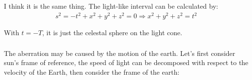 \documentclass[]{ctexart}
\begin{document}
		\subsubsection{}
			I think it is the same thing. The light-like interval can be calculated by:
				\begin{equation*}
				\begin{aligned}
					s^2=-t^2+x^2+y^2+z^2=0\Rightarrow x^2+y^2+z^2=t^2
				\end{aligned}
				\end{equation*}
			
			With $t=-T$, it is just the celestal sphere on the light cone. 
		
		\subsubsection{}
			The aberration may be caused by the motion of the earth. Let's first consider sun's frame of reference, the speed of light can be decomposed with respect to the velocity of the Earth, then consider the frame of the earth:
\end{document}
